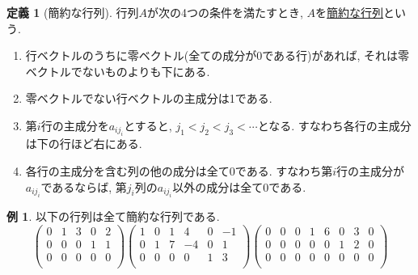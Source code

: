 \documentclass[dvipdfmx,a4paper,11pt]{article}
\theoremstyle{definition}
\newtheorem{dfn}[thm]{定義}
\newtheorem{exa}[thm]{例}
\begin{document}
\begin{tcolorbox}[
    colback = white,
    colframe = green!35!black,
    fonttitle = \bfseries,
    breakable = true]
    \begin{dfn}[簡約な行列]
  行列$A$が次の4つの条件を満たすとき, $A$を\underline{簡約な行列}という.
  \begin{enumerate}
\item 行ベクトルのうちに零ベクトル(全ての成分が0である行)があれば, それは零ベクトルでないものよりも下にある.
\item 零ベクトルでない行ベクトルの主成分は1である.
\item 第$i$行の主成分を$a_{ij_{i}}$とすると, $j_1<j_2<j_3<\cdots$となる. すなわち各行の主成分は下の行ほど右にある.
\item 各行の主成分を含む列の他の成分は全て0である. すなわち第$i$行の主成分が$a_{ij_{i}}$であるならば, 第$j_i$列の$a_{ij_{i}}$以外の成分は全て0である.
  \end{enumerate}
  \end{dfn}
 \end{tcolorbox}
 \begin{exa}
以下の行列は全て簡約な行列である.
$$
 \begin{pmatrix}
 0& 1& 3  & 0&2\\
 0& 0& 0  & 1&1\\
 0& 0& 0 & 0&0\\
 \end{pmatrix}
  \begin{pmatrix}
 1& 0& 1  & 4&0&-1\\
 0& 1& 7 & -4&0&1\\
 0& 0& 0 & 0&1&3\\
 \end{pmatrix}
   \begin{pmatrix}
 0& 0& 0  & 1&6&0&3&0\\
 0& 0& 0 & 0&0&1&2&0\\
 0& 0& 0 & 0&0&0&0&0 \\
 \end{pmatrix}
$$
\end{exa}
\end{document}
